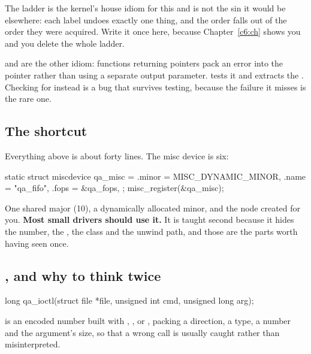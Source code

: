 \noindent The  ladder is the kernel's house idiom for this and is not the sin it would be
elsewhere: each label undoes exactly one thing, and the order falls out of the order they were
acquired. Write it once here, because Chapter~\ref{c6:ch} shows you  and you delete the
whole ladder.

 and  are the other idiom: functions returning pointers pack an error
into the pointer rather than using a separate output parameter.  tests it and
 extracts the . Checking for  instead is a bug that survives
testing, because the failure it misses is the rare one.

\subsection{The shortcut}
\label{c5:app:a8}

Everything above is about forty lines. The misc device is six:

\begin{ccode}
static struct miscdevice qa_misc = {
        .minor = MISC_DYNAMIC_MINOR,
        .name  = "qa_fifo",
        .fops  = &qa_fops,
};
misc_register(&qa_misc);
\end{ccode}

\noindent One shared major (10), a dynamically allocated minor, and the node created for you.
\textbf{Most small drivers should use it.} It is taught second because it hides the number, the
, the class and the unwind path, and those are the parts worth having seen once.

\subsection{, and why to think twice}
\label{c5:app:a9}

\begin{ccode}
long qa_ioctl(struct file *file, unsigned int cmd, unsigned long arg);
\end{ccode}

\noindent {} is an encoded number built with , ,  or
, packing a direction, a type, a number and the argument's size, so that a wrong call is
usually caught rather than misinterpreted.

